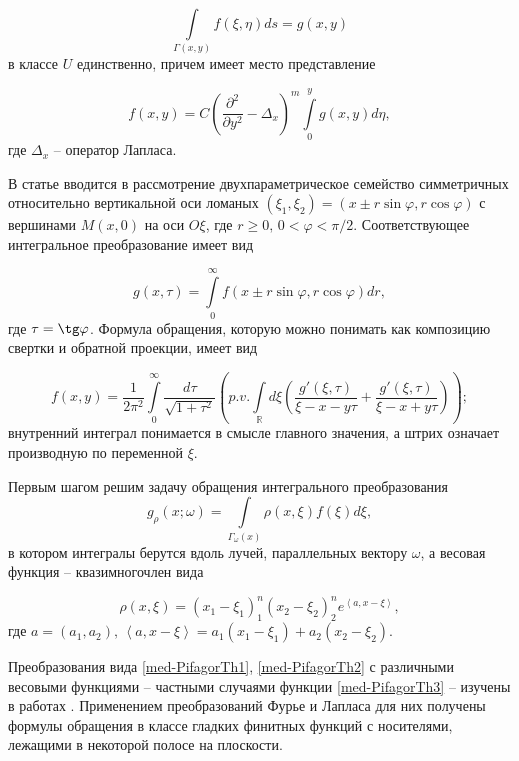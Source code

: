 $$\int\limits_{\Gamma(x,y)}f(\xi,\eta)ds=g(x,y)$$
в классе $U$ единственно, причем имеет место представление

\begin{equation}
\label{med-PifagorTh0}
f(x,y)=C\left(\frac{\partial^2}{\partial y^2}-\Delta_x\right)^m\int\limits_0^y g(x,y)d\eta,\end{equation}
где $\Delta_x$ -- оператор Лапласа.


В статье \cite{med-metka4}  вводится в рассмотрение  двухпараметрическое семейство симметричных относительно вертикальной оси ломаных $(\xi_1,\xi_2)=(x\pm r \sin\varphi, r \cos\varphi)$ с вершинами $M(x,0)$ на оси $O\xi$, где $r\geq0,\, 0<\varphi<\pi/2$. Соответствующее интегральное преобразование имеет вид

$$g(x,\tau)=\int\limits_0^\infty f(x\pm r\sin\varphi, r\cos\varphi)dr,$$
где $\tau=\tg\varphi$. Формула обращения, которую можно понимать как композицию свертки и обратной проекции, имеет вид

$$f(x,y)=\frac{1}{2\pi^2}\int\limits_0^\infty\frac{d\tau}{\sqrt{1+\tau^2}}\left(p.v.\int\limits_\mathbb R d\xi\left( \frac{g'(\xi,\tau)}{\xi-x-y\tau}+\frac{g'(\xi,\tau)}{\xi-x+y\tau}\right)\right);$$
внутренний интеграл понимается в смысле главного значения, а штрих означает производную по переменной $\xi$.

Первым шагом решим задачу обращения интегрального преобразования
\begin{equation}
\label{med-PifagorTh2}
g_\rho(x;\omega)=\int\limits_{\Gamma_\omega(x)}\rho(x,\xi)f(\xi)d\xi,\end{equation}
в котором интегралы берутся вдоль лучей, параллельных вектору $\omega$, а весовая функция -- квазимногочлен вида

\begin{equation}
\label{med-PifagorTh3}
\rho(x,\xi)=(x_1-\xi_1)^n_1(x_2-\xi_2)^n_2e^{\left<a,x-\xi\right>},\end{equation}
где $a=(a_1,a_2), \, \left<a,x-\xi\right>=a_1(x_1-\xi_1)+a_2(x_2-\xi_2)$.

Преобразования вида \eqref{med-PifagorTh1}, \eqref{med-PifagorTh2} с различными весовыми функциями -- частными случаями функции \eqref{med-PifagorTh3} -- изучены в работах \cite{med-metka5, med-metka6}. Применением преобразований Фурье и Лапласа для них получены формулы обращения в классе гладких финитных функций с носителями, лежащими в некоторой полосе на плоскости.













